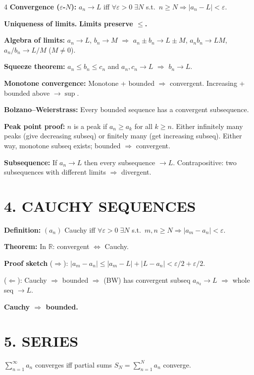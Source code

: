\documentclass[8pt,a4paper,landscape]{extarticle}
\begin{document}
\begin{multicols}{4}
\textbf{Convergence ($\varepsilon$-$N$):} $a_n\to L$ iff $\forall\varepsilon>0\;\exists N$ s.t.\ $n\geq N\Rightarrow|a_n-L|<\varepsilon$.

\textbf{Uniqueness of limits.} \textbf{Limits preserve $\leq$.}

\textbf{Algebra of limits:} $a_n\to L$, $b_n\to M$ $\Rightarrow$ $a_n\pm b_n\to L\pm M$, $a_nb_n\to LM$, $a_n/b_n\to L/M$ ($M\neq0$).

\textbf{Squeeze theorem:} $a_n\leq b_n\leq c_n$ and $a_n,c_n\to L$ $\Rightarrow$ $b_n\to L$.

\textbf{Monotone convergence:} Monotone + bounded $\Rightarrow$ convergent.
Increasing + bounded above $\to\sup$.

\textbf{Bolzano--Weierstrass:} Every bounded sequence has a convergent subsequence.

\textbf{Peak point proof:} $n$ is a peak if $a_n\geq a_k$ for all $k\geq n$. Either infinitely many peaks (give decreasing subseq) or finitely many (get increasing subseq). Either way, monotone subseq exists; bounded $\Rightarrow$ convergent.

\textbf{Subsequence:} If $a_n\to L$ then every subsequence $\to L$. Contrapositive: two subsequences with different limits $\Rightarrow$ divergent.

\section*{4. CAUCHY SEQUENCES}

\textbf{Definition:} $(a_n)$ Cauchy iff $\forall\varepsilon>0\;\exists N$ s.t.\ $m,n\geq N\Rightarrow|a_m-a_n|<\varepsilon$.

\textbf{Theorem:} In $\mathbb{R}$: convergent $\iff$ Cauchy.

\textbf{Proof sketch} ($\Rightarrow$): $|a_m-a_n|\leq|a_m-L|+|L-a_n|<\varepsilon/2+\varepsilon/2$.

($\Leftarrow$): Cauchy $\Rightarrow$ bounded $\Rightarrow$ (BW) has convergent subseq $a_{n_k}\to L$ $\Rightarrow$ whole seq $\to L$.

\textbf{Cauchy $\Rightarrow$ bounded.}

\section*{5. SERIES}

$\sum_{n=1}^\infty a_n$ converges iff partial sums $S_N=\sum_{n=1}^N a_n$ converge.


\end{multicols}
\end{document}
